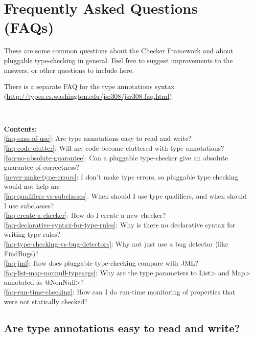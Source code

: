 \htmlhr
\chapter{Frequently Asked Questions (FAQs)\label{faq}}

These are some common questions about the Checker Framework and about
pluggable type-checking in general.  Feel free to suggest improvements to
the answers, or other questions to include here.

There is a separate FAQ for the type annotations syntax
(\url{http://types.cs.washington.edu/jsr308/jsr308-faq.html}).


~

\noindent
\textbf{Contents:} \\
\ref{faq-ease-of-use}: Are type annotations easy to read and write? \\
\ref{faq-code-clutter}: Will my code become cluttered with type annotations? \\
\ref{faq-no-absolute-guarantee}: Can a pluggable type-checker give an absolute guarantee of correctness? \\
\ref{never-make-type-errors}: I don't make type errors, so pluggable type checking would not help me \\
\ref{faq-qualifiers-vs-subclasses}: When should I use type qualifiers, and when should I use subclasses? \\
\ref{faq-create-a-checker}: How do I create a new checker? \\
\ref{faq-declarative-syntax-for-type-rules}: Why is there no declarative syntax for writing type rules? \\
\ref{faq-type-checking-vs-bug-detectors}: Why not just use a bug detector (like FindBugs)? \\
\ref{faq-jml}: How does pluggable type-checking compare with JML? \\
\ref{faq-list-map-nonnull-typeargs}: Why are the type parameters to \<List> and \<Map> annotated as \<@NonNull>? \\
\ref{faq-run-time-checking}: How can I do run-time monitoring of properties that were not statically checked?



\section{Are type annotations easy to read and write?\label{faq-ease-of-use}}

